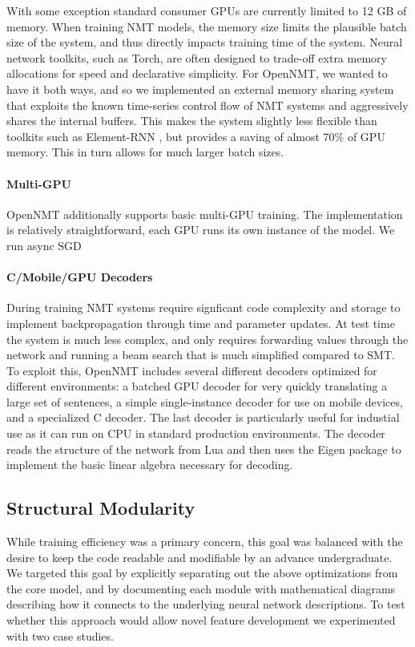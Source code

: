 \documentclass[11pt]{article}
\begin{document}
With some exception standard consumer GPUs are currently limited to 12
GB of memory. When training NMT models, the memory size limits the
plausible batch size of the system, and thus directly impacts training
time of the system. Neural network toolkits, such as Torch, are often
designed to trade-off extra memory allocations for speed and
declarative simplicity. For OpenNMT, we wanted to have it both ways,
and so we implemented an external memory sharing system that exploits
the known time-series control flow of NMT systems and aggressively
shares the internal buffers. This makes the system slightly less
flexible than toolkits such as Element-RNN \cite{}, but provides a
saving of almost 70\% of GPU memory. This in turn allows for much
larger batch sizes.


\paragraph{Multi-GPU} OpenNMT additionally supports basic multi-GPU
training. The implementation is relatively straightforward, each GPU
runs its own instance of the model. We run async SGD


\paragraph{C/Mobile/GPU Decoders} During training NMT systems require
signficant code complexity and storage to implement backpropagation
through time and parameter updates. At test time the system is much
less complex, and only requires forwarding values through the network
and running a beam search that is much simplified compared to SMT. To
exploit this, OpenNMT includes several different decoders optimized
for different environments: a batched GPU decoder for very quickly
translating a large set of sentences, a simple single-instance decoder
for use on mobile devices, and a specialized C decoder. The last
decoder is particularly useful for industial use as it can run on CPU
in standard production environments. The decoder reads the structure
of the network from Lua and then uses the Eigen package to implement
the basic linear algebra necessary for decoding.




\subsection{Structural Modularity}

While training efficiency was a primary concern, this goal was
balanced with the desire to keep the code readable and modifiable by
an advance undergraduate.  We targeted this goal by explicitly
separating out the above optimizations from the core model, and by 
documenting each module with mathematical diagrams describing how 
it connects to the underlying neural network descriptions. To test whether 
this approach would allow novel feature development we experimented with 
two case studies. 
\end{document}
